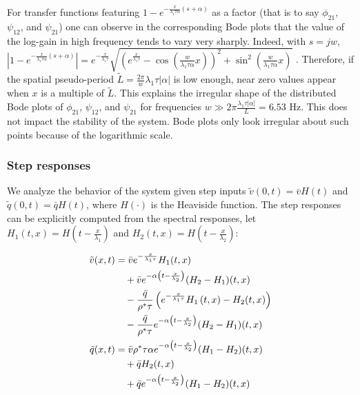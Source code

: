 \documentclass[a4paper, 10pt, conference]{ieeeconf}      %
\begin{document}
For transfer functions featuring {\footnotesize$1 - e^{-\frac{x}{\lambda_{1} \tau \alpha} \left(s + \alpha \right)}$} as a factor (that is to say $\phi_{21}$, $\psi_{12}$, and $\psi_{21}$) one can observe in the corresponding Bode plots that the value of the log-gain in high frequency tends to vary very sharply. Indeed, with $s = jw$,
{\footnotesize
$
\left| 
	1 - e^{-\frac{x}{\lambda_{1} \tau \alpha} \left(s + \alpha\right)}
\right| = 
e^{-\frac{x}{\lambda_{1} \tau}}
\sqrt{
	\left(
		e^{\frac{x}{\lambda_{1}\tau}} 
		-
		\cos\left(\frac{w}{\lambda_{1} \tau \alpha} x\right)
	\right)^{2}
	+
	\sin^{2}\left( \frac{w}{\lambda_{1} \tau \alpha} x \right)
}
$
}. Therefore, if the spatial pseudo-period {\footnotesize$\tilde{L}=\frac{2\pi}{w} \lambda_{1} \tau \left|\alpha\right|$} is low enough, near zero values appear when $x$ is a multiple of $\tilde{L}$. This explains the irregular shape of the distributed Bode plots of $\phi_{21}$, $\psi_{12}$, and $\psi_{21}$ for frequencies {\footnotesize$w \gg 2 \pi \frac{\lambda_{1} \tau \left|\alpha\right|}{L} = 6.53$} Hz. This does not impact the stability of the system. Bode plots only look irregular about such points because of the logarithmic scale.\\

\subsubsection{Step responses}
We analyze the behavior of the system given step inputs {\footnotesize$\tilde{v}(0,t)=\bar{v}H(t)$} and {\footnotesize$\tilde{q}(0,t)=\bar{q}H(t)$}, where $H(\cdot)$ is the Heaviside function. The step responses can be explicitly computed from the spectral responses, let {\footnotesize$H_1(t,x) = H\left(t-\frac{x}{\lambda_{1}}\right)$} and
{\footnotesize$H_2(t,x) = H\left(t - \frac{x}{\lambda_{2}} \right)$}:

{\footnotesize
\begin{align}
\tilde{v}(x,t) &= 
\bar{v}
e^{-\frac{x}{\lambda_{1}\tau}}H_1(t,x)
\notag\\
&\quad
+\bar{v}
e^{-\alpha \left(t - \frac{x}{\lambda_{2}} \right)}
	(H_2 - H_1)(t,x)
\notag \\
&\quad
- \dfrac{\bar{q}}{\rho^* \tau}
\left(
	e^{-\frac{x}{\lambda_{1}\tau}}H_1\left(t,x\right) 
	- H_2(t,x)
\right) 
\notag\\
&\quad
- \dfrac{\bar{q}}{\rho^* \tau} e^{-\alpha \left(t - \frac{x}{\lambda_{2}} \right)}
	(H_2 - H_1)(t,x)\\
\tilde{q}(x,t) &= \bar{v} \rho^*\tau \alpha e^{-\alpha \left(t - \frac{x}{\lambda_{2}} \right)}
	(H_1 - H_2)(t,x)
\notag \\
&\quad+ 
\bar{q}
H_2(t,x)
\notag\\
&\quad
+
\bar{q}
e^{-\alpha \left(t - \frac{x}{\lambda_{2}} \right)}
	(H_1 - H_2)(t,x)	
\end{align}
}
\end{document}
